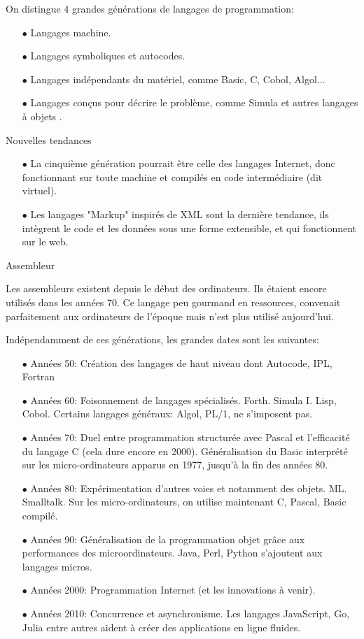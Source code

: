 \documentclass[a4paper,12pt]{article} %
\begin{document}
On distingue 4 grandes générations de langages de programmation:
\begin{itemize}
   \item[$\bullet$]Langages machine.
   \item[$\bullet$]Langages symboliques et autocodes.
   \item[$\bullet$]Langages indépendants du matériel, comme Basic, C, Cobol, Algol...
   \item[$\bullet$]Langages conçus pour décrire le problème, comme Simula et autres langages à objets .
\end{itemize}
   Nouvelles tendances 
\begin{itemize}   
\item[$\bullet$] La cinquième génération pourrait être celle des langages Internet, donc fonctionnant sur toute
machine et compilés en code intermédiaire (dit virtuel).
\item[$\bullet$] Les langages "Markup" inspirés de XML sont la dernière tendance, ils intègrent le code et les
données sous une forme extensible, et qui fonctionnent sur le web.
\end{itemize}
Assembleur
 
 Les assembleurs existent depuis le début des ordinateurs. Ils étaient encore utilisés dans les années 70. Ce langage peu gourmand en ressources, convenait parfaitement aux ordinateurs de l’époque mais n’est plus utilisé aujourd’hui.
 
 Indépendamment de ces générations, les grandes dates sont les suivantes:
 \begin{itemize}
\item[$\bullet$] Années 50: Création des langages de haut niveau dont Autocode, IPL, Fortran
\item[$\bullet$] Années 60: Foisonnement de langages spécialisés. Forth. Simula I. Lisp, Cobol.
Certains langages généraux: Algol, PL/1, ne s’imposent pas.
\item[$\bullet$] Années 70: Duel entre programmation structurée avec Pascal et l'efficacité du langage C
 (cela dure encore en 2000). Généralisation du Basic interprété sur les micro-ordinateurs
apparus en 1977, jusqu'à la fin des années 80.
\item[$\bullet$] Années 80: Expérimentation d'autres voies et notamment des objets. ML. Smalltalk. Sur les
micro-ordinateurs, on utilise maintenant C, Pascal, Basic compilé.
\item[$\bullet$] Années 90: Généralisation de la programmation objet grâce aux performances des microordinateurs. Java, Perl, Python s'ajoutent aux langages micros.
\item[$\bullet$] Années 2000: Programmation Internet (et les innovations à venir).
\item[$\bullet$] Années 2010: Concurrence et asynchronisme. Les langages JavaScript, Go, Julia entre autres
aident à créer des applications en ligne fluides.
\end{itemize}
\end{document}
